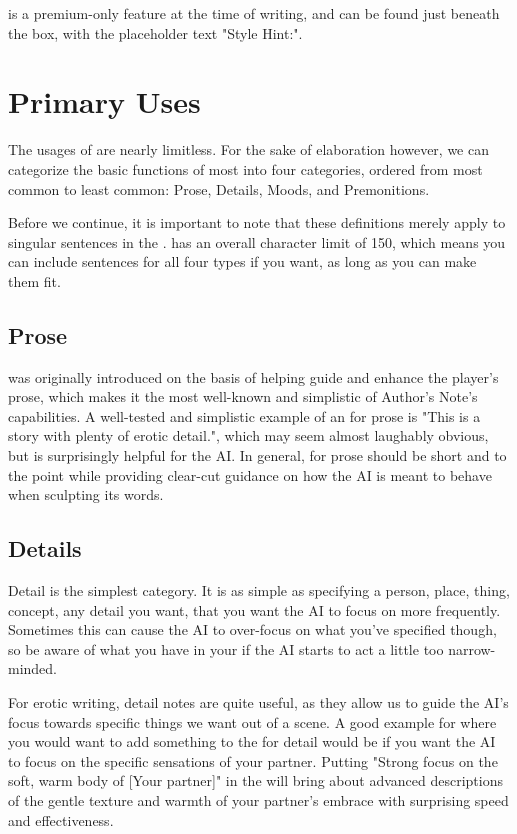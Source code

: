 ﻿\documentclass[Coomer-main.tex]{subfiles}
\begin{document}
\an is a premium-only feature at the time of writing, and can be found just beneath the \rem box, with the placeholder text "Style Hint:".

\section{Primary Uses}

The usages of \an are nearly limitless.
For the sake of elaboration however, we can categorize the basic functions of most \ans into four categories, ordered from most common to least common: Prose, Details, Moods, and Premonitions.

Before we continue, it is important to note that these definitions merely apply to singular sentences in the \an. \an has an overall character limit of 150, which means you can include sentences for all four types if you want, as long as you can make them fit.

\subsection{Prose}

\an was originally introduced on the basis of helping guide and enhance the player's prose, which makes it the most well-known and simplistic of Author's Note's capabilities.
A well-tested and simplistic example of an \an for prose is "This is a story with plenty of erotic detail.", which may seem almost laughably obvious, but is surprisingly helpful for the AI.
In general, \ans for prose should be short and to the point while providing clear-cut guidance on how the AI is meant to behave when sculpting its words.

\subsection{Details}

Detail is the simplest \an category.
It is as simple as specifying a person, place, thing, concept, any detail you want, that you want the AI to focus on more frequently.
Sometimes this can cause the AI to over-focus on what you've specified though, so be aware of what you have in your \an if the AI starts to act a little too narrow-minded.

For erotic writing, detail notes are quite useful, as they allow us to guide the AI's focus towards specific things we want out of a scene.
A good example for where you would want to add something to the \an for detail would be if you want the AI to focus on the specific sensations of your partner.
Putting "Strong focus on the soft, warm body of [Your partner]" in the \an will bring about advanced descriptions of the gentle texture and warmth of your partner’s embrace with surprising speed and effectiveness.
\end{document}

